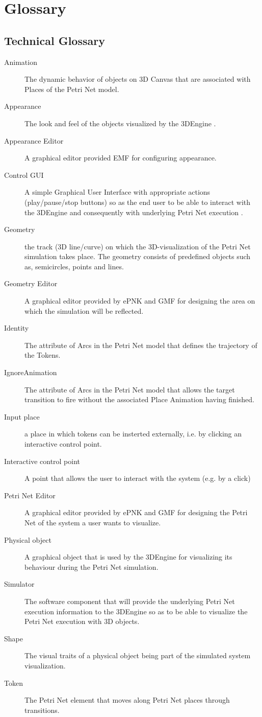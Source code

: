 \section{Glossary}

\subsection{Technical Glossary}
\begin{description}
  \item[Animation] The dynamic behavior of objects on 3D Canvas that are associated with Places of the Petri Net model.
  \item[Appearance] The look and feel of the objects visualized by the 3DEngine .
  \item[Appearance Editor] A graphical editor provided EMF for configuring appearance.
  \item[Control GUI] A simple Graphical User Interface with appropriate actions (play/pause/stop buttons) so as the end user to be able to interact with the 3DEngine and consequently with underlying Petri Net execution .
  \item[Geometry] the track (3D line/curve) on which the 3D-visualization of the Petri Net simulation takes place. The geometry consists of predefined objects such as, semicircles, points and lines.
  \item[Geometry Editor] A graphical editor provided by ePNK and GMF for designing the area on which the simulation will be reflected.
  \item[Identity] The attribute of Arcs in the Petri Net model that defines the trajectory of the Tokens.
  \item[IgnoreAnimation] The attribute of Arcs in the Petri Net model that allows the target transition to fire without the associated Place Animation having finished.
  \item[Input place] a place in which tokens can be insterted externally, i.e. by clicking an interactive control point.
  \item[Interactive control point] A point that allows the user to interact with the system (e.g. by a click)
  \item[Petri Net Editor] A graphical editor provided by ePNK and GMF for designing the Petri Net of the system a user wants to visualize.
  \item[Physical object] A graphical object that is used by the 3DEngine for visualizing its behaviour during the Petri Net simulation.
  \item[Simulator] The software component that will provide the underlying Petri Net execution information to the 3DEngine so as to be able to visualize the Petri Net execution with 3D objects.
  \item[Shape] The visual traits of a physical object being part of the simulated system visualization.
  \item[Token] The Petri Net element that moves along Petri Net places through transitions.
\end{description}

